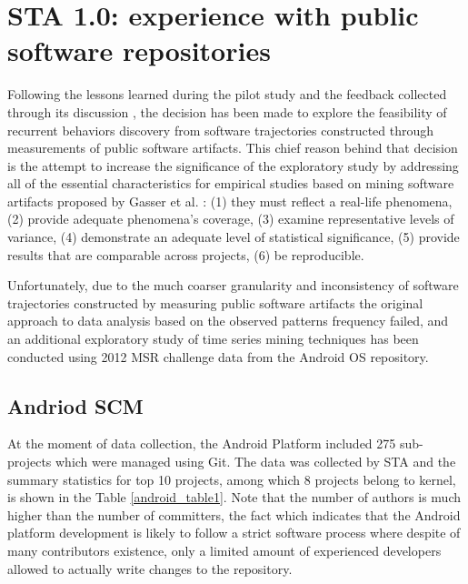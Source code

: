 \section{STA 1.0: experience with public software repositories}
Following the lessons learned during the pilot study and the feedback collected through its discussion \cite{csdl2-10-09}, 
the decision has been made to explore the feasibility of recurrent behaviors discovery from software trajectories constructed 
through measurements of public software artifacts. This chief reason behind that decision is the attempt to increase 
the significance of the exploratory study by addressing all of the essential characteristics for empirical studies based on mining 
software artifacts proposed by Gasser et al. \cite{citeulike:13058334}:  
(1) they must reflect a real-life phenomena, 
(2) provide adequate phenomena's coverage, 
(3) examine representative levels of variance, 
(4) demonstrate an adequate level of statistical significance,
(5) provide results that are comparable across projects,
(6) be reproducible. 

Unfortunately, due to the much coarser granularity and inconsistency of software trajectories constructed by measuring
public software artifacts the original approach to data analysis based on the observed patterns frequency failed, 
and an additional exploratory study of time series mining techniques has been conducted using 2012 MSR challenge data
\cite{MSRChallenge2012} from the Android OS repository.

\subsection{Andriod SCM}
At the moment of data collection, the Android Platform included 275 sub-projects which were managed using Git. 
The data was collected by STA and the summary statistics for top 10 projects, among which 8 projects belong to kernel, 
is shown in the Table \ref{android_table1}. Note that the number of authors is much higher than the number of committers, 
the fact which indicates that the Android platform development is likely to follow a strict software process where despite 
of many contributors existence, only a limited amount of experienced developers allowed to actually write changes to 
the repository.


